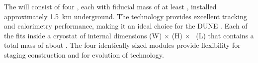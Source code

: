 



%


The \fdfiducialmass {}  will consist of four  , each with fiducial mass of at least \nominalmodsize, installed approximately \SI{1.5}{km} underground. The  technology provides
excellent tracking and calorimetry performance, making it an ideal
choice for the DUNE . Each of the  fits inside a cryostat of internal dimensions
\cryostatwdth (W) $\times$ \cryostatht (H) $\times$ \cryostatlen~(L) that contains a total \lar{} mass of about \larmass{}.
 The four identically sized modules provide flexibility for staging construction and for evolution of  technology.

